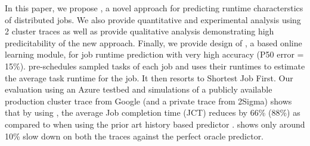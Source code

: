 In this paper, we propose \lTechnique, a novel approach for predicting runtime
characterstics of distributed jobs.  We also provide quantitative and
experimental analysis using 2 cluster traces as well as provide qualitative
analysis demonstrating high predicitability of the new approach.  Finally, we
provide design of \name, a \lTechnique based online learning module, for job
runtime prediction with very high accuracy (P50 error = 15\%).
\name pre-schedules sampled tasks of each job and uses their runtimes to
estimate the average task runtime for the job.  It then resorts to Shortest Job
First. Our evaluation using an Azure testbed and simulations of a publicly
available production cluster trace from Google (and a private trace from
2Sigma) shows that by using \name, the average Job completion time (JCT)
reduces by 66\% (88\%) as compared to when using the prior art history based
predictor \primarybase. \name shows only around 10\% slow down on both the
traces against the perfect oracle predictor.
\fi
